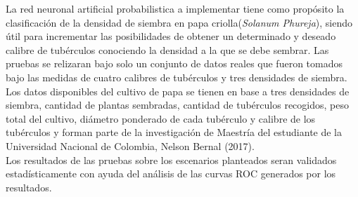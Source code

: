 La red neuronal artificial probabilistica a implementar tiene como propósito la clasificación de la densidad de siembra en papa criolla(\textit{Solanum Phureja}), siendo útil para incrementar las posibilidades de obtener un determinado y deseado calibre de tubérculos conociendo la densidad a la que se debe sembrar.  Las pruebas se relizaran bajo solo un conjunto de datos reales que fueron tomados bajo las medidas de cuatro calibres de tubérculos y tres densidades de siembra.\\

Los datos disponibles del cultivo de papa se tienen en base a tres densidades de siembra, cantidad de plantas sembradas, cantidad de tubérculos recogidos, peso total del cultivo, diámetro ponderado de cada tubérculo y calibre de los tubérculos y forman parte de la investigación de Maestría del estudiante de la Universidad Nacional de Colombia, Nelson Bernal (2017).\\

Los resultados de las pruebas sobre los escenarios planteados seran validados estadísticamente con ayuda del análisis de las curvas ROC generados por los resultados.\\


